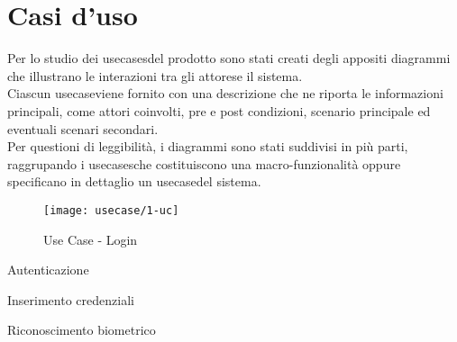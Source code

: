 \section{Casi d'uso}
\label{sec:usecase}

Per lo studio dei \glspl{usecase}\glsoccur del prodotto sono stati creati degli appositi diagrammi che illustrano le interazioni tra gli \glspl{attore}\glsoccur e il sistema.\\
Ciascun \gls{usecase}\glsoccur viene fornito con una descrizione che ne riporta le informazioni principali, come attori coinvolti, pre e post condizioni, scenario principale ed eventuali scenari secondari.\\
Per questioni di leggibilità, i diagrammi sono stati suddivisi in più parti, raggrupando i \glspl{usecase}\glsoccur che costituiscono una macro-funzionalità oppure specificano in dettaglio un \gls{usecase}\glsoccur del sistema.

\begin{figure}[!h] 
    \centering 
    \texttt{[image: usecase/1-uc]} 
    \caption{Use Case - Login}
    \label{fig:uc-login}
\end{figure}

\begin{usecase}{01}{Autenticazione}
    \usecaseimg{\ref{fig:uc-login}}
    \label{UC01}
\end{usecase}

\begin{usecase}{02}{Inserimento credenziali}
    \usecaseimg{\ref{fig:uc-login}}
    \label{UC02}
\end{usecase}

\begin{usecase}{03}{Riconoscimento biometrico}
    \usecaseimg{\ref{fig:uc-login}}
    \label{UC03}
\end{usecase}

